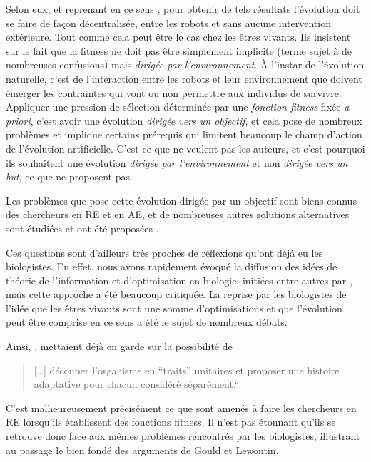 Selon eux, et reprenant en ce sens \cite{watson02embodiedevolutiondistributingevolutionaryalgorithmpopulationrobots}, pour obtenir de tels résultats l'évolution doit se faire de façon décentralisée, entre les robots et sans aucune intervention extérieure. Tout comme cela peut être le cas chez les êtres vivants. Ils insistent sur le fait que la fitness ne doit pas être simplement implicite (terme sujet à de nombreuses confusions) mais \emph{dirigée par l'environnement}. \`A l'instar de l'évolution naturelle, c'est de l'interaction entre les robots et leur environnement que doivent émerger les contraintes qui vont ou non permettre aux individus de survivre. Appliquer une pression de sélection déterminée par une \emph{fonction fitness} fixée \emph{a priori}, c'est avoir une évolution \emph{dirigée vers un objectif}, et cela pose de nombreux problèmes et implique certains prérequis qui limitent beaucoup le champ d'action de l'évolution artificielle. C'est ce que ne veulent pas les auteurs, et c'est pourquoi ils souhaitent une évolution \emph{dirigée par l'environnement} et non \emph{dirigée vers un but},  ce que \cite{watson02embodiedevolutiondistributingevolutionaryalgorithmpopulationrobots} ne proposent pas.

Les problèmes que pose cette évolution dirigée par un objectif sont biens connus des chercheurs en RE et en AE, et de nombreuses autres solutions alternatives sont étudiées et ont été proposées \citep{lehman10efficientlyevolvingprogramsthroughsearchnovelty,lehman2011abandoningobjectivesevolutionthroughthesearchfornoveltyalone,risi2009hownoveltysearchescapesthedeceptivetrapoflearningtolearn,mouret2012encouragingbehavioraldiversityinevolutionaryrobotics}. 

Ces questions sont d'ailleurs très proches de réflexions qu'ont déjà eu les biologistes. En effet, nous avons rapidement évoqué la diffusion des idées de théorie de l'information et d'optimisation en biologie, initiées entre autres par \cite{maynardsmith78optimizationtheoryinevolution}, mais cette approche a été beaucoup critiquée. La reprise par les biologistes de l'idée que les êtres vivants sont une somme d'optimisations et que l'évolution peut être comprise en ce sens a été le sujet de nombreux débats.

Ainsi, \cite{gould1979spandrelssanmarcopanglossianparadigmcritiqueadaptationistprogramme}, mettaient déjà en garde sur la possibilité de
\begin{quote}
   [\ldots] découper l'organisme en ``traits'' unitaires et  proposer une histoire adaptative pour chacun considéré séparément.``
\end{quote}
C'est malheureusement précisément ce que sont amenés à faire les chercheurs en RE lorsqu'ils établissent des fonctions fitness. Il n'est pas étonnant qu'ils se retrouve donc face aux mêmes problèmes rencontrés par les biologistes, illustrant au passage le bien fondé des arguments de Gould et Lewontin.


